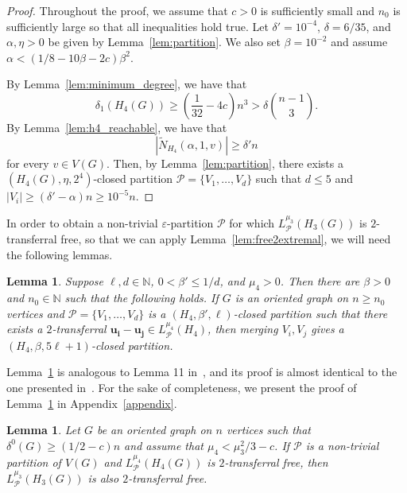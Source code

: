 \documentclass[11pt]{amsart}
\newtheorem{lemma}[theorem]{Lemma}
\def\N{\mathbb{N}}
\newcommand{\CP}{\mathcal{P}}
\newcommand{\wt}{\widetilde}
\newcommand{\veps}{\varepsilon}
\begin{document}
\begin{proof}
    Throughout the proof, we assume that $c>0$ is sufficiently small and $n_0$ is sufficiently large so that all inequalities hold true. Let $\delta'=10^{-4}$, $\delta=6/35$, and $\alpha, \eta > 0$ be given by Lemma~\ref{lem:partition}. We also set $\beta = 10^{-2}$ and assume $\alpha < \left( 1/8-10\beta-2c \right) \beta^2$.
    
    By Lemma~\ref{lem:minimum_degree}, we have that 
    $$\delta_1(H_4(G)) \ge 
    \left( \frac{1}{32} - 4c \right) n^3 > 
    \delta \binom{n-1}{3}.$$
    By Lemma~\ref{lem:h4_reachable}, we have that 
    $$|\wt N_{H_4}(\alpha,1,v)|\ge \delta' n$$
    for every $v\in V(G)$.
    Then, by Lemma~\ref{lem:partition}, there exists a $(H_4(G),\eta,2^{4})$-closed partition $\CP= \{ V_1,\dots,V_d \}$ such that $d\le 5$ and $|V_i|\ge (\delta'-\alpha)n\ge 10^{-5} n$.
\end{proof}

In order to obtain a non-trivial $\veps$-partition $\CP$ for which $L_\CP^{\mu_3}(H_3(G))$ is $2$-transferral free, so that we can apply Lemma~\ref{lem:free2extremal}, we will need the following lemmas.

\begin{lemma}\label{lem:merge}
    Suppose $\ell, d \in \N$, $0< \beta' \le 1/d$, and $\mu_4 > 0$. Then there are $\beta>0$ and $n_0 \in \N$ such that the following holds. If $G$ is an oriented graph on $n\ge n_0$ vertices and $\CP = \{V_1, \dots, V_d\}$ is a $(H_4,\beta',\ell)$-closed partition such that there exists a $2$-transferral $\mathbf{u_i}-\mathbf{u_j}\in L_{\CP}^{\mu_4}(H_4)$, then merging $V_i,V_j$ gives a $(H_4,\beta,5\ell+1)$-closed partition.
\end{lemma}

Lemma~\ref{lem:merge} is analogous to Lemma 11 in~\cite{li-molla}, and its proof is almost identical to the one presented in~\cite{li-molla}. For the sake of completeness, we present the proof of Lemma~\ref{lem:merge} in Appendix~\ref{appendix}.

\begin{lemma}\label{lem:free2free}
    Let $G$ be an oriented graph on $n$ vertices such that $\delta^0(G)\ge (1/2-c)n$ and assume that $\mu_4 < \mu_3^2/3 - c$.
    If $\CP$ is a non-trivial partition of $V(G)$ and $L_\CP^{\mu_4}(H_4(G))$ is $2$-transferral free, then $L_\CP^{\mu_3}(H_3(G))$ is also $2$-transferral free.
\end{lemma}
\end{document}

